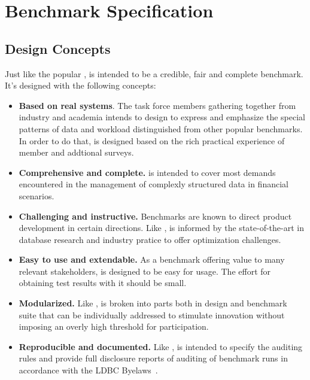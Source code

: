 \chapter{Benchmark Specification}
\label{sec:benchmark-specification}

\section{Design Concepts}

Just like the popular \ldbcsnb, \ldbcfinbench is intended to be a credible, fair and complete benchmark.
It's designed with the following concepts:

\begin{itemize}
    \item \textbf{Based on real systems}. The task force members gathering together from industry and academia
          intends to design \ldbcfinbench to express and emphasize the special patterns of data and workload
          distinguished from other popular benchmarks. In order to do that, \ldbcfinbench is designed based on
          the rich practical experience of member and addtional surveys.
    \item \textbf{Comprehensive and complete.} \ldbcfinbench is intended to cover most demands encountered
          in the management of complexly structured data in financial scenarios.
    \item \textbf{Challenging and instructive.} Benchmarks are known to direct product development in
          certain directions. Like \ldbcsnb, \ldbcfinbench is informed by the state-of-the-art in database research
          and industry pratice to offer optimization challenges.
    \item \textbf{Easy to use and extendable.} As a benchmark offering value to many relevant stakeholders,
          \ldbcfinbench is designed to be easy for usage. The effort for obtaining test results with it should
          be small.
    \item \textbf{Modularized.} Like \ldbcsnb, \ldbcfinbench is broken into parts both in design and benchmark
          suite that can be individually addressed to stimulate innovation without imposing an overly high threshold
          for participation.
    \item \textbf{Reproducible and documented.} Like \ldbcsnb, \ldbcfinbench is intended to specify the auditing
          rules and provide full disclosure reports of auditing of benchmark runs in accordance with the LDBC
          Byelaws~\cite{ldbc_byelaws}.
\end{itemize}

